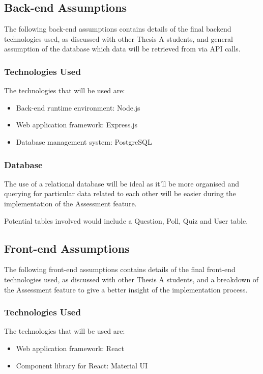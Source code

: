 \subsection{Back-end Assumptions}
The following back-end assumptions contains details of the final backend technologies used, as discussed with other Thesis A students, and general assumption of the database which data will be retrieved from via API calls. 

\subsubsection{Technologies Used}
The technologies that will be used are:
\begin{itemize}
	\item Back-end runtime environment: Node.js
	\item Web application framework: Express.js
	\item Database management system: PostgreSQL
\end{itemize}

\subsubsection{Database}
The use of a relational database will be ideal as it'll be more organised and querying for particular data related to each other will be easier during the implementation of the Assessment feature. 

Potential tables involved would include a Question, Poll, Quiz and User table. 


\subsection{Front-end Assumptions}
The following front-end assumptions contains details of the final front-end technologies used, as discussed with other Thesis A students, and a breakdown of the Assessment feature to give a better insight of the implementation process.

\subsubsection{Technologies Used}
The technologies that will be used are:
\begin{itemize}
	\item Web application framework: React
	\item Component library for React: Material UI
\end{itemize}

